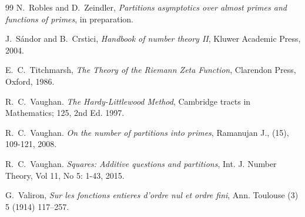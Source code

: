 \documentclass[11pt]{amsart}
\numberwithin{equation}{section}
\numberwithin{figure}{section}
\theoremstyle{definition}
\begin{document}
\begin{thebibliography}{99}
N.~Robles and D.~Zeindler, \emph{Partitions asymptotics over almost primes and functions of primes}, 
in preparation.

J.~S\'{a}ndor and B.~Crstici, \emph{Handbook of number theory \textnormal{II}}, Kluwer Academic Press, 2004.

E.~C.~Titchmarsh, \emph{The Theory of the Riemann Zeta Function}, Clarendon Press, Oxford, 1986.

R.~C.~Vaughan. \textit{The Hardy-Littlewood Method}, Cambridge tracts in Mathematics; 125, 2nd Ed. 1997.

R.~C.~Vaughan. \textit{On the number of partitions into primes}, Ramanujan J., (15), 109-121, 2008.

R.~C.~Vaughan. \textit{Squares: Additive questions and partitions}, Int. J. Number Theory, Vol 11, No 5: 1-43, 2015.

G.~Valiron, \emph{Sur les fonctions entieres d’ordre nul et ordre fini}, Ann. Toulouse (3) 5
(1914) 117–257.

\end{thebibliography}
\end{document}
